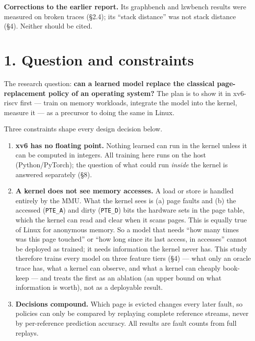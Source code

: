 \documentclass[10pt,a4paper]{article}
\newcommand{\code}[1]{\texttt{#1}}
\begin{document}
\textbf{Corrections to the earlier report.} Its graphbench and lzwbench results were measured on broken traces (§2.4); its ``stack distance'' was not stack distance (§4). Neither should be cited.

\clearpage\tableofcontents\clearpage
\section*{1. Question and constraints}

The research question: \textbf{can a learned model replace the classical page-replacement policy of an operating system?} The plan is to show it in xv6-riscv first — train on memory workloads, integrate the model into the kernel, measure it — as a precursor to doing the same in Linux.

Three constraints shape every design decision below.

\begin{enumerate}
\item \textbf{xv6 has no floating point.} Nothing learned can run in the kernel unless it can be computed in integers. All training here runs on the host (Python/PyTorch); the question of what could run \emph{inside} the kernel is answered separately (§8).
\item \textbf{A kernel does not see memory accesses.} A load or store is handled entirely by the MMU. What the kernel sees is (a) page faults and (b) the accessed (\code{PTE\_\allowbreak{}A}) and dirty (\code{PTE\_\allowbreak{}D}) bits the hardware sets in the page table, which the kernel can read and clear when it scans pages. This is equally true of Linux for anonymous memory. So a model that needs ``how many times was this page touched'' or ``how long since its last access, in accesses'' cannot be deployed as trained; it needs information the kernel never has. This study therefore trains every model on three feature tiers (§4) — what only an oracle trace has, what a kernel can observe, and what a kernel can cheaply book-keep — and treats the first as an ablation (an upper bound on what information is worth), not as a deployable result.
\item \textbf{Decisions compound.} Which page is evicted changes every later fault, so policies can only be compared by replaying complete reference streams, never by per-reference prediction accuracy. All results are fault counts from full replays.
\end{enumerate}
\end{document}
